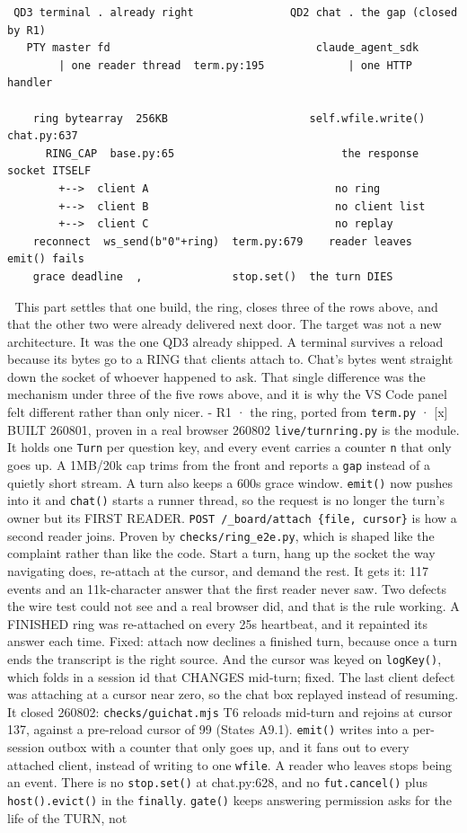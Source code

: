 \begin{verbatim}
 QD3 terminal . already right               QD2 chat . the gap (closed by R1)
   PTY master fd                                claude_agent_sdk
        | one reader thread  term.py:195             | one HTTP handler

    ring bytearray  256KB                      self.wfile.write()  chat.py:637
      RING_CAP  base.py:65                          the response socket ITSELF
        +-->  client A                             no ring
        +-->  client B                             no client list
        +-->  client C                             no replay
    reconnect  ws_send(b"0"+ring)  term.py:679    reader leaves  emit() fails
    grace deadline  ,              stop.set()  the turn DIES
\end{verbatim}
📌 This part settles that one build, the ring, closes three of the rows above, and that the other two were already delivered next door. The target was not a new architecture. It was the one QD3 already shipped. A terminal survives a reload because its bytes go to a RING that clients attach to. Chat's bytes went straight down the socket of whoever happened to ask. That single difference was the mechanism under three of the five rows above, and it is why the VS Code panel felt different rather than only nicer. - R1 · the ring, ported from \texttt{term.py} · [x] BUILT 260801, proven in a real browser 260802 \texttt{live/turnring.py} is the module. It holds one \texttt{Turn} per question key, and every event carries a counter \texttt{n} that only goes up. A 1MB/20k cap trims from the front and reports a \texttt{gap} instead of a quietly short stream. A turn also keeps a 600s grace window. \texttt{emit()} now pushes into it and \texttt{chat()} starts a runner thread, so the request is no longer the turn's owner but its FIRST READER. \texttt{POST /\_board/attach \{file, cursor\}} is how a second reader joins. Proven by \texttt{checks/ring\_e2e.py}, which is shaped like the complaint rather than like the code. Start a turn, hang up the socket the way navigating does, re-attach at the cursor, and demand the rest. It gets it: 117 events and an 11k-character answer that the first reader never saw. Two defects the wire test could not see and a real browser did, and that is the rule working. A FINISHED ring was re-attached on every 25s heartbeat, and it repainted its answer each time. Fixed: attach now declines a finished turn, because once a turn ends the transcript is the right source. And the cursor was keyed on \texttt{logKey()}, which folds in a session id that CHANGES mid-turn; fixed. The last client defect was attaching at a cursor near zero, so the chat box replayed instead of resuming. It closed 260802: \texttt{checks/guichat.mjs} T6 reloads mid-turn and rejoins at cursor 137, against a pre-reload cursor of 99 (States A9.1). \texttt{emit()} writes into a per-session outbox with a counter that only goes up, and it fans out to every attached client, instead of writing to one \texttt{wfile}. A reader who leaves stops being an event. There is no \texttt{stop.set()} at chat.py:628, and no \texttt{fut.cancel()} plus \texttt{host().evict()} in the \texttt{finally}. \texttt{gate()} keeps answering permission asks for the life of the TURN, not 